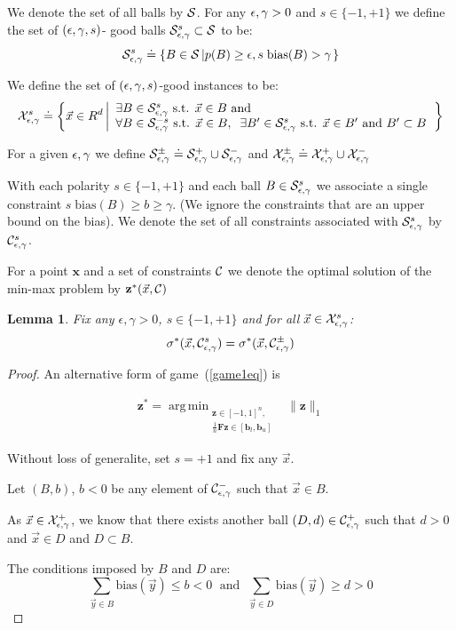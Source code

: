 \documentclass{article}
\newtheorem{lemma}[theorem]{Lemma}
\DeclareMathOperator*{\argmin}{arg\,min}
\newcommand{\err}{\mbox{err}}
\newcommand{\X}{{\cal X}}
\newcommand{\x}{\vec{x}}
\newcommand{\y}{\vec{y}}
\renewcommand{\SS}{{\cal S}} %
\newcommand{\CC}{{\cal C}}  %
\newcommand{\vF}{\mathbf{F}}
\newcommand{\vx}{\mathbf{x}}
\newcommand{\vb}{\mathbf{b}}
\newcommand{\vz}{\mathbf{z}}
\newcommand{\bias}{\text{bias}}
\begin{document}
We denote the set of all balls by $\SS$. For any $\epsilon,\gamma>0$
and $s \in \{-1,+1\}$ we define the set of $(\epsilon,\gamma,s)$-
good balls $\SepsGamSig \subset \SS$ to be:
\[
\SepsGamSig \doteq \left\{B \in \SS \left| p(B) \geq \epsilon,
s\; \bias(B) > \edge \right. \right\}
\]

\newcommand{\XepsGamSig}{\X_{\epsilon,\edge}^{s}}
\newcommand{\XepsGam}{\X_{\epsilon,\edge}}

We define the set of $(\epsilon,\gamma,s)$-good instances to be:
\[
\XepsGamSig \doteq \left\{\x \in R^d \left|
\begin{array}{l}
\exists B \in \SepsGamSig \mbox{ s.t. } \x \in B \mbox{ and } \\
\forall B \in \SepsGamMinusSig \mbox{ s.t. } \x \in B,\;\;
\exists B' \in \SepsGamSig \mbox{ s.t. } \x \in B' \mbox{ and } B'
\subset B
\end{array}
\right. \right\}
\]

\newcommand{\sol}{{\bf SOL}}

For a given $\epsilon,\gamma$ we define $\SepsGam^{\pm} \doteq \SepsGam^{+}
\cup \SepsGam^{-}$
and $\XepsGam^{\pm} \doteq \XepsGam^{+} \cup \XepsGam^{-}$

\newcommand{\erreg}{\err_{\epsilon,\gamma}}

With each polarity $s \in \{-1,+1\}$ and each ball
$B \in \SepsGam^s$ we associate a single constraint $s\; \bias(B) \geq b
\geq \gamma$. (We ignore the constraints that are an upper bound on
the bias). We denote the set of all constraints associated with
$\SepsGam^s$ by $\ConstrepsGam^s$.

For a point $\vx$ and a set of constraints $\CC$ we denote the optimal
solution of the min-max problem by $\vz^*(\x,\CC)$

\begin{lemma}
  Fix any $\epsilon,\gamma>0$, $s \in \{-1,+1\}$ and for all
  $\x \in \XepsGamSig$:
  \[
  \sigma^*(\x,\ConstrepsGamSig) = \sigma^*(\x,\ConstrepsGam^{\pm})
  \]
\end{lemma}

\begin{proof}
  An alternative form of game~(\ref{game1eq}) is

\begin{align}
\displaystyle 
\vz^* = \argmin_{\substack{ \vz \in [-1,1]^n ,
    \\ \frac{1}{n} \vF \vz \in [\vb_l,\vb_u]}} \;\; \|\vz\|_1
\end{align}

Without loss of generalite, set $s=+1$ and fix any $\x$.

Let $(B,b)$, $b<0$ be any element of $\ConstrepsGam^{-}$
such that $\x \in B$.

As $\x \in \XepsGam^{+}$, we know that there exists another ball
$(D,d) \in \ConstrepsGam^{+}$ such that $d>0$ and $\x \in D$ and $D \subset B$.

The conditions imposed by $B$ and $D$ are:
\[
\sum_{\y \in B} \bias(\y) \leq b < 0 \;\mbox{ and }\;\sum_{\y \in D} \bias(\y) \geq d > 0
\]

\end{proof}
  
\end{document}
